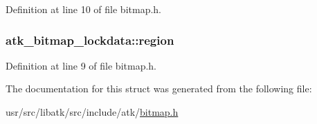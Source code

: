 Definition at line 10 of file bitmap.\+h.

\hypertarget{structatk__bitmap__lockdata_a75fc9b9740a38278200e4cbe27b15e44}{
\subsubsection[{region}]{ atk\+\_\+bitmap\+\_\+lockdata\+::region}}\label{structatk__bitmap__lockdata_a75fc9b9740a38278200e4cbe27b15e44}


Definition at line 9 of file bitmap.\+h.



The documentation for this struct was generated from the following file\+:\begin{DoxyCompactItemize}
\item 
usr/src/libatk/src/include/atk/\hyperlink{bitmap_8h}{bitmap.\+h}\end{DoxyCompactItemize}
